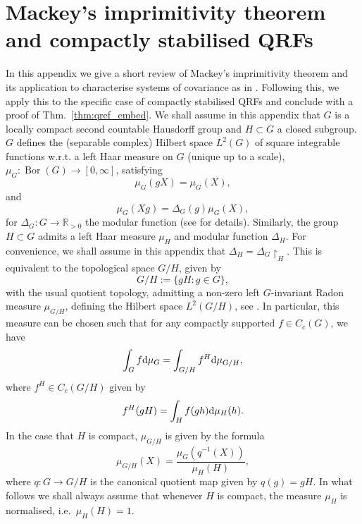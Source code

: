 \documentclass[sn-mathphys-num]{sn-jnl}%
\newcommand{\RR}{\mathbb{R}}
\DeclareMathOperator{\Bor}{Bor}
\newcommand{\diff}{\textup{d}}
\numberwithin{equation}{section}
\theoremstyle{thmstyleone}%
\theoremstyle{thmstyletwo}%
\theoremstyle{thmstylethree}%
\begin{document}
\section{Mackey's imprimitivity theorem and compactly stabilised QRFs}
\label{appx:imprimitvity_thm}
\label{appx:G_integrals}
In this appendix we give a short review of Mackey's imprimitivity theorem and its application to characterise systems of covariance as in \cite{Cattaneo:1979}. Following this, we apply this to the specific case of compactly stabilised QRFs and conclude with a proof of Thm.~\ref{thm:qref_embed}. We shall assume in this appendix that $G$ is a locally compact second countable Hausdorff group and $H\subset G$ a closed subgroup. $G$ defines the (separable complex) Hilbert space $L^2(G)$ of square integrable functions w.r.t. a left Haar measure on $G$ (unique up to a scale), $\mu_G:\Bor(G)\to[0,\infty]$, satisfying
\begin{equation}
    \mu_G(gX)=\mu_G(X),
\end{equation}
and
\begin{equation}
\label{eq:modular_func}
    \mu_G(Xg)=\Delta_G(g)\mu_G(X),
\end{equation}
for $\Delta_G:G\to \RR_{>0}$ the modular function (see \cite{deitmar2008principles} for details). Similarly, the group $H\subset G$ admits a left Haar measure $\mu_H$ and modular function $\Delta_H$. For convenience, we shall assume in this appendix that $\Delta_H=\Delta_{G}\restriction_H$. This is equivalent to the topological space $G/H$, given by
\begin{equation}
    G/H:=\{gH:g\in G\},
\end{equation}
with the usual quotient topology, admitting a non-zero left $G$-invariant Radon measure $\mu_{G/H}$, defining the Hilbert space $L^2(G/H)$, see \cite[Thm.~1.5.2]{deitmar2008principles}. In particular, this measure can be chosen such that for any compactly supported $f\in C_c(G)$, we have
\begin{equation}
\label{eq:quotient_measure}
    \int_G f\diff\mu_G=\int_{G/H}f^H\diff\mu_{G/H},
\end{equation}
where $f^H\in C_c(G/H)$ given by
\begin{equation}
    f^H(gH)=\int_H f(gh)\diff\mu_H(h).
\end{equation}
In the case that $H$ is compact, $\mu_{G/H}$ is given by the formula
\begin{equation}\mu_{G/H}(X)=\frac{\mu_G(q^{-1}(X))}{\mu_H(H)},\end{equation}
where $q:G\to G/H$ is the canonical quotient map given by $q(g)=gH$. In what follows we shall always assume that whenever $H$ is compact, the measure $\mu_H$ is normalised, i.e.~$\mu_H(H)=1$. 
\end{document}
